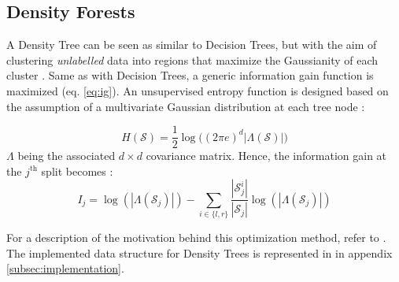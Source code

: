 \documentclass[10pt]{article}
\begin{document}
\subsection{Density Forests}

A Density Tree can be seen as similar to Decision Trees, but with the aim of clustering \textit{unlabelled} data into regions that maximize the Gaussianity of each cluster \cite{CW2017}. Same as with Decision Trees, a generic information gain function is maximized (eq. \ref{eq:ig}). An unsupervised entropy function is designed based on the assumption of a multivariate Gaussian distribution at each tree node \cite{decisionForests-MSR}:

\begin{equation}
    H(\mathcal{S}) = \frac{1}{2}\log\Big((2\pi e)^d|\mathtt{\Lambda}(\mathcal{S})|\Big)
\end{equation}
$\mathtt{\Lambda}$ being the associated $d \times d$ covariance matrix. Hence, the information gain at the $j^{\text{th}}$ split becomes \cite{decisionForests-MSR}:
\begin{equation}
    I_j = \log(|\mathtt{\Lambda}(\mathcal{S}_j)|) - \sum_{i\in \{l, r\}}\frac{|\mathcal{S}_j^i|}{|\mathcal{S}_j|}\log(|\mathtt{\Lambda}(\mathcal{S}_j)|)
\end{equation}

For a description of the motivation behind this optimization method, refer to \cite{decisionForests-MSR}. The implemented data structure for Density Trees is represented in in appendix \ref{subsec:implementation}.
\end{document}
